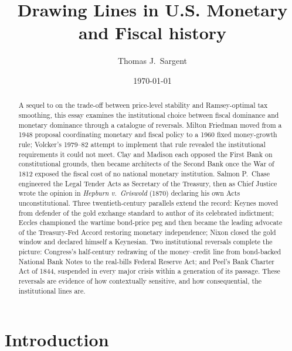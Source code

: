 \documentclass[12pt]{article}
\title{Drawing Lines in U.S. Monetary and Fiscal history}
\author{Thomas J.~Sargent}
\date{\today}
\begin{document}
\maketitle

\begin{abstract}
A sequel to \citet{Sargent2011} on the trade-off between price-level
stability and Ramsey-optimal tax smoothing, this essay examines the
institutional choice between fiscal dominance and monetary dominance
through a catalogue of reversals.  Milton Friedman moved from a 1948
proposal coordinating monetary and fiscal policy to a 1960 fixed
money-growth rule; Volcker's 1979--82 attempt to implement that rule
revealed the institutional requirements it could not meet.  Clay and
Madison each opposed the First Bank on constitutional grounds, then
became architects of the Second Bank once the War of 1812 exposed the
fiscal cost of no national monetary institution.  Salmon P.\ Chase
engineered the Legal Tender Acts as Secretary of the Treasury, then as
Chief Justice wrote the opinion in \textit{Hepburn v.\ Griswold} (1870)
declaring his own Acts unconstitutional.  Three twentieth-century
parallels extend the record: Keynes moved from defender of the gold
exchange standard to author of its celebrated indictment; Eccles
championed the wartime bond-price peg and then became the leading
advocate of the Treasury-Fed Accord restoring monetary independence;
Nixon closed the gold window and declared himself a Keynesian.  Two
institutional reversals complete the picture: Congress's half-century
redrawing of the money--credit line from bond-backed National Bank Notes
to the real-bills Federal Reserve Act; and Peel's Bank Charter Act of
1844, suspended in every major crisis within a generation of its
passage.  These reversals are evidence of how contextually sensitive,
and how consequential, the institutional lines are.
\end{abstract}
%
%
\section{Introduction}
\end{document}
